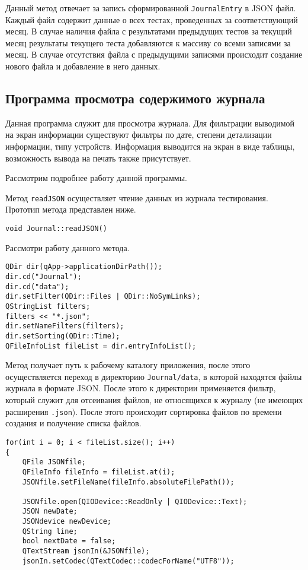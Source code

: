 Данный метод отвечает за запись сформированной \texttt{JournalEntry} в JSON файл. Каждый файл содержит данные о всех
тестах, проведенных за соответствующий месяц. В случае наличия файла с результатами предыдущих тестов за текущий месяц
результаты текущего теста добавляются к массиву со всеми записями за месяц. В случае отсутствия файла с предыдущими
записями происходит создание нового файла и добавление в него данных.

\subsection{Программа просмотра содержимого журнала}
Данная программа служит для просмотра журнала. Для фильтрации выводимой на экран информации существуют фильтры по дате,
степени детализации информации, типу устройств. Информация выводится на экран в виде таблицы, возможность вывода на
печать также присутствует.

Рассмотрим подробнее работу данной программы.

Метод \texttt{readJSON} осуществляет чтение данных из журнала тестирования. Прототип метода представлен ниже.
\medskip
\begin{verbatim}
void Journal::readJSON()
\end{verbatim}
\medskip

Рассмотри работу данного метода.
\medskip
\begin{verbatim}
QDir dir(qApp->applicationDirPath());
dir.cd("Journal");
dir.cd("data");
dir.setFilter(QDir::Files | QDir::NoSymLinks);
QStringList filters;
filters << "*.json";
dir.setNameFilters(filters);
dir.setSorting(QDir::Time);
QFileInfoList fileList = dir.entryInfoList();
\end{verbatim}
\medskip

Метод получает путь к рабочему каталогу приложения, после этого осуществляется переход в директорию
\texttt{Journal/data}, в которой находятся файлы журнала в формате JSON. После этого к директории применяется фильтр,
который служит для отсеивания файлов, не относящихся к журналу (не имеющих расширения \texttt{.json}). После этого
происходит сортировка файлов по времени создания и получение списка файлов.

\medskip
\begin{verbatim}
for(int i = 0; i < fileList.size(); i++)
{
	QFile JSONfile;
	QFileInfo fileInfo = fileList.at(i);
	JSONfile.setFileName(fileInfo.absoluteFilePath());

	JSONfile.open(QIODevice::ReadOnly | QIODevice::Text);
	JSON newDate;
	JSONdevice newDevice;
	QString line;
	bool nextDate = false;
	QTextStream jsonIn(&JSONfile);
	jsonIn.setCodec(QTextCodec::codecForName("UTF8"));
\end{verbatim}
\medskip

